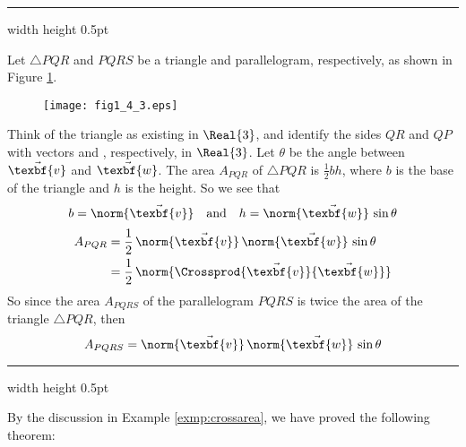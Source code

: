\vspace{4mm}
\hrule width \textwidth height 0.5pt
\begin{exmp}\label{exmp:crossarea}
 Let $\triangle PQR$ and $PQRS$ be a triangle and parallelogram, respectively, as shown in Figure \ref{fig:crossarea}.

 \begin{figure}[h]
 \begin{center}
  \texttt{[image: fig1\_4\_3.eps]}\vspace{-5mm}
 \end{center}
 \caption[]{}
 \label{fig:crossarea}
\end{figure}

 Think of the triangle as existing in $\Real{3}$, and identify the sides $QR$ and $QP$ with vectors  and
 , respectively, in $\Real{3}$. Let $\theta$ be the angle between $\vec{\texbf{v}}$ and $\vec{\texbf{w}}$. The area
 $A_{PQR}$ of $\triangle PQR$ is $\frac{1}{2} b h$, where $b$ is the base of the triangle and $h$ is the height. So
 we see that
 \begin{displaymath}
  b = \norm{\vec{\texbf{v}}} \quad \text{and} \quad h = \norm{\vec{\texbf{w}}}\,\sin \theta
 \end{displaymath}
 \begin{align*}
  A_{PQR} &= \frac{1}{2}\,\norm{\vec{\texbf{v}}}\,\norm{\vec{\texbf{w}}}\,\sin \theta\\
  &= \frac{1}{2}\,\norm{\Crossprod{\vec{\texbf{v}}}{\vec{\texbf{w}}}}
 \end{align*}
 So since the area $A_{PQRS}$ of the parallelogram $PQRS$ is twice the area of the triangle $\triangle PQR$, then
 \begin{displaymath}
  A_{PQRS} = \norm{\vec{\texbf{v}}}\,\norm{\vec{\texbf{w}}}\,\sin \theta
 \end{displaymath}
\end{exmp}
\hrule width \textwidth height 0.5pt
\vspace{4mm}

By the discussion in Example \ref{exmp:crossarea}, we have proved the following theorem:


